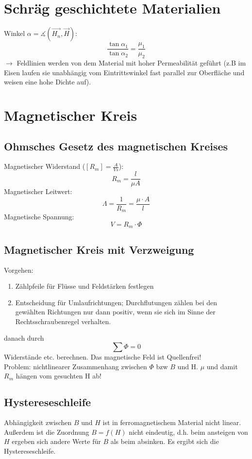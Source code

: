 \documentclass[12pt,a4paper]{article}
\begin{document}
\section{Schräg geschichtete Materialien}
Winkel $\alpha = \measuredangle{(\vec{H_n}, \vec{H})}$:
\[\frac{\tan \alpha_1}{\tan \alpha_2} = \frac{\mu_1}{\mu_2}\]
$\rightarrow$ Feldlinien werden von dem Material mit hoher Permeabilität geführt (z.B im Eisen laufen sie unabhängig vom Eintrittswinkel fast parallel zur Oberfläche und weisen eine hohe Dichte auf).

\section{Magnetischer Kreis}
\subsection{Ohmsches Gesetz des magnetischen Kreises}
Magnetischer Widerstand ($[R_m] = \frac{A}{Vs}$):
\[R_m = \frac{l}{\mu A}\]
Magnetischer Leitwert:
\[\Lambda = \frac{1}{R_m} = \frac{\mu \cdot A}{l}\]
Magnetische Spannung:
\[V = R_m \cdot \Phi\]

\subsection{Magnetischer Kreis mit Verzweigung}
Vorgehen:
\begin{enumerate}
\item
Zählpfeile für Flüsse und Feldstärken festlegen
\item
Entscheidung für Umlaufrichtungen; Durchflutungen zählen bei den gewählten
Richtungen nur dann positiv, wenn sie sich im Sinne der Rechtsschraubenregel
verhalten.
\end{enumerate}
danach durch
\[\sum{\Phi} = 0\]
Widerstände etc. berechnen. Das magnetische Feld ist Quellenfrei!\\
Problem: nichtlinearer Zusammenhang zwischen $\Phi$ bzw $B$ und H. $\mu$ und damit $R_m$ hängen vom gesuchten H ab!

\subsection{Hystereseschleife}
Abhängigkeit zwischen $B$ und $H$ ist in ferromagnetischem Material nicht linear. Außerdem ist die Zuordnung $B = f(H)$ nicht eindeutig, d.h. beim ansteigen von $H$ ergeben sich andere Werte für $B$ als beim absinken. Es ergibt sich die Hystereseschleife.
\end{document}
